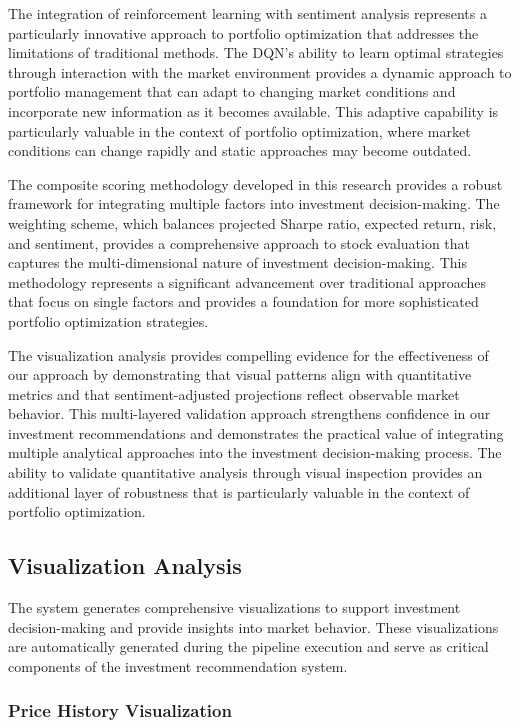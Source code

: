 \documentclass[12pt,a4paper]{article}
\begin{document}
The integration of reinforcement learning with sentiment analysis represents a particularly innovative approach to portfolio optimization that addresses the limitations of traditional methods. The DQN's ability to learn optimal strategies through interaction with the market environment provides a dynamic approach to portfolio management that can adapt to changing market conditions and incorporate new information as it becomes available. This adaptive capability is particularly valuable in the context of portfolio optimization, where market conditions can change rapidly and static approaches may become outdated.

The composite scoring methodology developed in this research provides a robust framework for integrating multiple factors into investment decision-making. The weighting scheme, which balances projected Sharpe ratio, expected return, risk, and sentiment, provides a comprehensive approach to stock evaluation that captures the multi-dimensional nature of investment decision-making. This methodology represents a significant advancement over traditional approaches that focus on single factors and provides a foundation for more sophisticated portfolio optimization strategies.

The visualization analysis provides compelling evidence for the effectiveness of our approach by demonstrating that visual patterns align with quantitative metrics and that sentiment-adjusted projections reflect observable market behavior. This multi-layered validation approach strengthens confidence in our investment recommendations and demonstrates the practical value of integrating multiple analytical approaches into the investment decision-making process. The ability to validate quantitative analysis through visual inspection provides an additional layer of robustness that is particularly valuable in the context of portfolio optimization.

\subsection{Visualization Analysis}

The system generates comprehensive visualizations to support investment decision-making and provide insights into market behavior. These visualizations are automatically generated during the pipeline execution and serve as critical components of the investment recommendation system.

\subsubsection{Price History Visualization}
\end{document}
